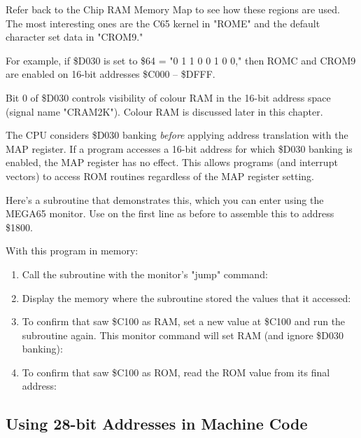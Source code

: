 Refer back to the Chip RAM Memory Map to see how these regions are used. The
most interesting ones are the C65 kernel in "ROME" and the default character
set data in "CROM9."

For example, if \$D030 is set to \$64 = "0 1 1 0 0 1 0 0," then ROMC and CROM9
are enabled on 16-bit addresses \$C000 -- \$DFFF.

Bit 0 of \$D030 controls visibility of colour RAM in the 16-bit address space
(signal name "CRAM2K"). Colour RAM is discussed later in this chapter.

The CPU considers \$D030 banking {\em before} applying address translation with
the MAP register. If a program accesses a 16-bit address for which \$D030 banking is
enabled, the MAP register has no effect. This allows programs (and interrupt
vectors) to access ROM routines regardless of the MAP register setting.

Here's a subroutine that demonstrates this, which you can enter using the MEGA65
monitor. Use  on the first line as before to assemble this to address
\$1800.


With this program in memory:

\begin{enumerate}
\item Call the subroutine with the monitor's "jump" command: 
\item Display the memory where the subroutine stored the values that it
accessed: 
\item To confirm that  saw \$C100 as RAM, set a new value at \$C100
and run the subroutine again. This monitor command will set RAM (and ignore
\$D030 banking): 
\item To confirm that  saw \$C100 as ROM, read the ROM value
from its final address: 
\end{enumerate}

\subsection{Using 28-bit Addresses in Machine Code}

